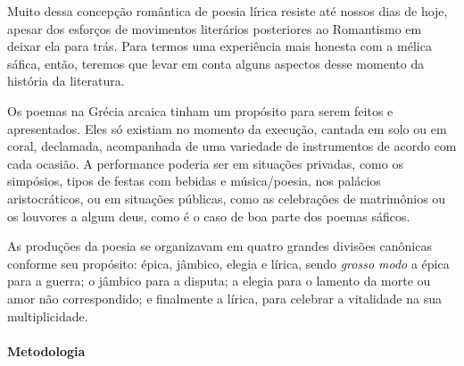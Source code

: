 \documentclass[12pt]{extarticle}
\begin{document}
Muito dessa concepção romântica de poesia lírica resiste até nossos dias
de hoje, apesar dos esforços de movimentos literários posteriores ao Romantismo
em deixar ela para trás. Para termos uma experiência mais honesta com a mélica 
sáfica, então, teremos que levar em conta alguns aspectos desse momento da 
história da literatura.

Os poemas na Grécia arcaica tinham um propósito para serem feitos e apresentados. 
Eles só existiam no momento da execução, cantada em solo ou em coral, 
declamada, acompanhada de uma variedade de instrumentos de acordo com cada ocasião. 
A performance poderia ser em situações privadas, como os simpósios, tipos 
de festas com bebidas e música/poesia, nos palácios aristocráticos, ou em situações 
públicas, como as celebrações de matrimônios ou os louvores a algum deus, como é o
caso de boa parte dos poemas sáficos. 

As produções da poesia se organizavam em quatro grandes divisões canônicas conforme
seu propósito: épica, jâmbico, elegia e lírica, sendo \emph{grosso modo} a épica 
para a guerra; o jâmbico para a disputa; a elegia para o lamento da morte ou amor 
não correspondido; e finalmente a lírica, para celebrar a vitalidade na sua multiplicidade.


\paragraph{Metodologia} 
\end{document}
